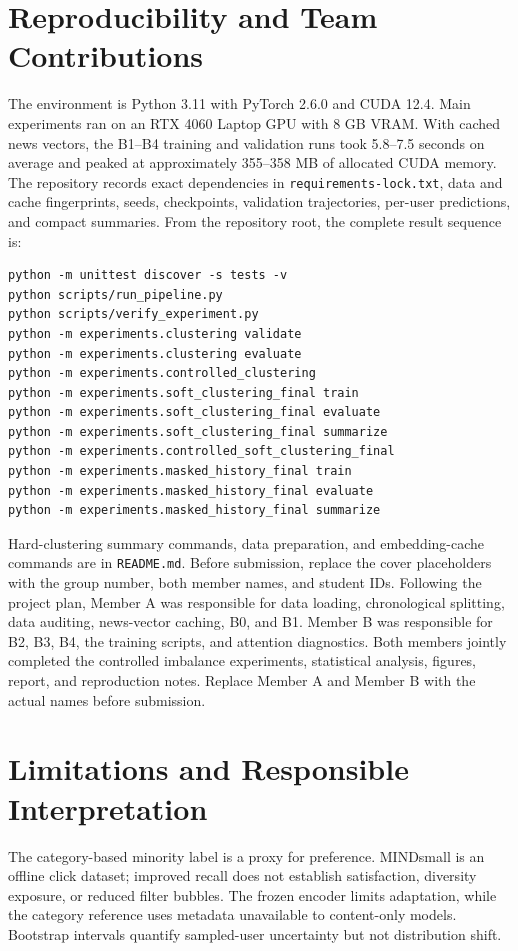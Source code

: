 \section{Reproducibility and Team Contributions}
The environment is Python 3.11 with PyTorch 2.6.0 and CUDA 12.4. Main experiments ran on an RTX 4060 Laptop GPU with 8 GB VRAM. With cached news vectors, the B1--B4 training and validation runs took 5.8--7.5 seconds on average and peaked at approximately 355--358 MB of allocated CUDA memory. The repository records exact dependencies in \texttt{requirements-lock.txt}, data and cache fingerprints, seeds, checkpoints, validation trajectories, per-user predictions, and compact summaries. From the repository root, the complete result sequence is:
\begin{verbatim}
python -m unittest discover -s tests -v
python scripts/run_pipeline.py
python scripts/verify_experiment.py
python -m experiments.clustering validate
python -m experiments.clustering evaluate
python -m experiments.controlled_clustering
python -m experiments.soft_clustering_final train
python -m experiments.soft_clustering_final evaluate
python -m experiments.soft_clustering_final summarize
python -m experiments.controlled_soft_clustering_final
python -m experiments.masked_history_final train
python -m experiments.masked_history_final evaluate
python -m experiments.masked_history_final summarize
\end{verbatim}
Hard-clustering summary commands, data preparation, and embedding-cache commands are in \texttt{README.md}. Before submission, replace the cover placeholders with the group number, both member names, and student IDs. Following the project plan, Member A was responsible for data loading, chronological splitting, data auditing, news-vector caching, B0, and B1. Member B was responsible for B2, B3, B4, the training scripts, and attention diagnostics. Both members jointly completed the controlled imbalance experiments, statistical analysis, figures, report, and reproduction notes. Replace Member A and Member B with the actual names before submission.

\section{Limitations and Responsible Interpretation}
The category-based minority label is a proxy for preference. MINDsmall is an offline click dataset; improved recall does not establish satisfaction, diversity exposure, or reduced filter bubbles. The frozen encoder limits adaptation, while the category reference uses metadata unavailable to content-only models. Bootstrap intervals quantify sampled-user uncertainty but not distribution shift.

